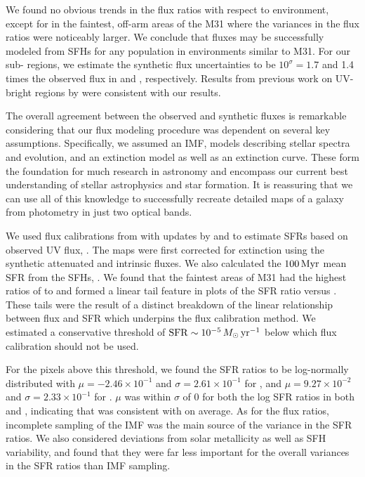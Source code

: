 We found no obvious trends in the flux ratios with respect to environment,
except for in the faintest, off-arm areas of the M31 where the variances in the
flux ratios were noticeably larger. We conclude that fluxes may be successfully
modeled from SFHs for any population in environments similar to M31. For our
sub-\kpc{} regions, we estimate the synthetic flux uncertainties to be
$10^\sigma = 1.7$ and 1.4 times the observed flux in \fuv{} and \nuv{},
respectively. Results from previous work on UV-bright regions by
\citet{Simones:2014} were consistent with our results.

The overall agreement between the observed and synthetic fluxes is remarkable
considering that our flux modeling procedure was dependent on several key
assumptions. Specifically, we assumed an IMF, models describing stellar spectra
and evolution, and an extinction model as well as an extinction curve. These
form the foundation for much research in astronomy and encompass our current
best understanding of stellar astrophysics and star formation. It is reassuring
that we can use all of this knowledge to successfully recreate detailed maps of
a galaxy from photometry in just two optical bands.

We used flux calibrations from \citet{Kennicutt:1998} with updates by
\citet{Hao:2011} and \citet{Murphy:2011} to estimate SFRs based on observed UV
flux, \sfrx{}. The \fxobs{} maps were first corrected for extinction using the
synthetic attenuated and intrinsic fluxes. We also calculated the $100\,\mathrm{Myr}$
mean SFR from the SFHs, \sfroneh{}. We found that the faintest areas of M31 had
the highest ratios of \sfrx{} to \sfroneh{} and formed a linear tail feature in
plots of the SFR ratio versus \sfroneh{}. These tails were the result of a
distinct breakdown of the linear relationship between flux and SFR which
underpins the flux calibration method. We estimated a conservative threshold of
$\mathrm{SFR} \sim 10^{-5}\,M_\odot\,\mathrm{yr}^{-1}$ below which flux calibration should not be
used.

For the pixels above this threshold, we found the SFR ratios to be log-normally
distributed with $\mu = -2.46\times 10^{-1}$ and $\sigma = 2.61\times 10^{-1}$
for \fuv{}, and $\mu = 9.27\times 10^{-2}$ and $\sigma = 2.33\times 10^{-1}$
for \nuv{}. $\mu$ was within $\sigma$ of 0 for both the log SFR ratios in both
\fuv{} and \nuv{}, indicating that \sfrx{} was consistent with \sfroneh{} on
average. As for the flux ratios, incomplete sampling of the IMF was the main
source of the variance in the SFR ratios. We also considered deviations from
solar metallicity as well as SFH variability, and found that they were far less
important for the overall variances in the SFR ratios than IMF sampling.

